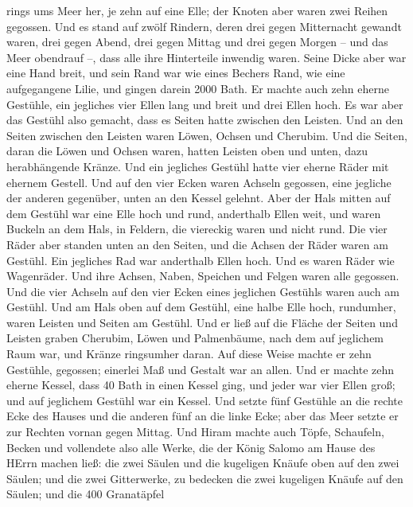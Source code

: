 rings ums Meer her, je zehn auf eine Elle; der Knoten aber waren zwei
Reihen gegossen.  Und es stand auf zwölf Rindern, deren
drei gegen Mitternacht gewandt waren, drei gegen Abend, drei gegen
Mittag und drei gegen Morgen -- und das Meer obendrauf --, dass alle
ihre Hinterteile inwendig waren.  Seine Dicke aber war eine
Hand breit, und sein Rand war wie eines Bechers Rand, wie eine
aufgegangene Lilie, und gingen darein 2000 Bath.  Er machte
auch zehn eherne Gestühle, ein jegliches vier Ellen lang und breit und
drei Ellen hoch.  Es war aber das Gestühl also gemacht,
dass es Seiten hatte zwischen den Leisten.  Und an den
Seiten zwischen den Leisten waren Löwen, Ochsen und Cherubim. Und die
Seiten, daran die Löwen und Ochsen waren, hatten Leisten oben und unten,
dazu herabhängende Kränze.  Und ein jegliches Gestühl hatte
vier eherne Räder mit ehernem Gestell. Und auf den vier Ecken waren
Achseln gegossen, eine jegliche der anderen gegenüber, unten an den
Kessel gelehnt.  Aber der Hals mitten auf dem Gestühl war
eine Elle hoch und rund, anderthalb Ellen weit, und waren Buckeln an dem
Hals, in Feldern, die viereckig waren und nicht rund.  Die
vier Räder aber standen unten an den Seiten, und die Achsen der Räder
waren am Gestühl. Ein jegliches Rad war anderthalb Ellen hoch.
 Und es waren Räder wie Wagenräder. Und ihre Achsen, Naben,
Speichen und Felgen waren alle gegossen.  Und die vier
Achseln auf den vier Ecken eines jeglichen Gestühls waren auch am
Gestühl.  Und am Hals oben auf dem Gestühl, eine halbe Elle
hoch, rundumher, waren Leisten und Seiten am Gestühl.  Und
er ließ auf die Fläche der Seiten und Leisten graben Cherubim, Löwen und
Palmenbäume, nach dem auf jeglichem Raum war, und Kränze ringsumher
daran.  Auf diese Weise machte er zehn Gestühle, gegossen;
einerlei Maß und Gestalt war an allen.  Und er machte zehn
eherne Kessel, dass 40 Bath in einen Kessel ging, und jeder war vier
Ellen groß; und auf jeglichem Gestühl war ein Kessel.  Und
setzte fünf Gestühle an die rechte Ecke des Hauses und die anderen fünf
an die linke Ecke; aber das Meer setzte er zur Rechten vornan gegen
Mittag.  Und Hiram machte auch Töpfe, Schaufeln, Becken und
vollendete also alle Werke, die der König Salomo am Hause des HErrn
machen ließ:  die zwei Säulen und die kugeligen Knäufe oben
auf den zwei Säulen; und die zwei Gitterwerke, zu bedecken die zwei
kugeligen Knäufe auf den Säulen;  und die 400 Granatäpfel
